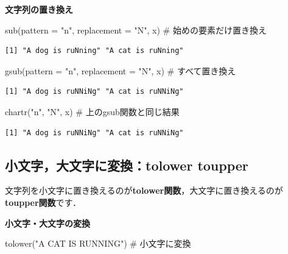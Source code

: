 \documentclass[
  letterpaper,
  DIV=11,
  numbers=noendperiod]{scrreprt}
\newenvironment{Shaded}{\begin{snugshade}}{\end{snugshade}}
\newcommand{\AttributeTok}[1]{\textcolor[rgb]{0.40,0.45,0.13}{#1}}
\newcommand{\CommentTok}[1]{\textcolor[rgb]{0.37,0.37,0.37}{#1}}
\newcommand{\FunctionTok}[1]{\textcolor[rgb]{0.28,0.35,0.67}{#1}}
\newcommand{\NormalTok}[1]{\textcolor[rgb]{0.00,0.23,0.31}{#1}}
\newcommand{\StringTok}[1]{\textcolor[rgb]{0.13,0.47,0.30}{#1}}
\begin{document}
\textbf{文字列の置き換え}

\begin{Shaded}
\begin{Highlighting}[]
\FunctionTok{sub}\NormalTok{(}\AttributeTok{pattern =} \StringTok{"n"}\NormalTok{, }\AttributeTok{replacement =} \StringTok{"N"}\NormalTok{, x) }\CommentTok{\# 始めの要素だけ置き換え}
\end{Highlighting}
\end{Shaded}

\begin{verbatim}
[1] "A dog is ruNning" "A cat is ruNning"
\end{verbatim}

\begin{Shaded}
\begin{Highlighting}[]
\FunctionTok{gsub}\NormalTok{(}\AttributeTok{pattern =} \StringTok{"n"}\NormalTok{, }\AttributeTok{replacement =} \StringTok{"N"}\NormalTok{, x) }\CommentTok{\# すべて置き換え}
\end{Highlighting}
\end{Shaded}

\begin{verbatim}
[1] "A dog is ruNNiNg" "A cat is ruNNiNg"
\end{verbatim}

\begin{Shaded}
\begin{Highlighting}[]
\FunctionTok{chartr}\NormalTok{(}\StringTok{"n"}\NormalTok{, }\StringTok{"N"}\NormalTok{, x) }\CommentTok{\# 上のgsub関数と同じ結果}
\end{Highlighting}
\end{Shaded}

\begin{verbatim}
[1] "A dog is ruNNiNg" "A cat is ruNNiNg"
\end{verbatim}

\hypertarget{ux5c0fux6587ux5b57ux5927ux6587ux5b57ux306bux5909ux63dbtolower-toupper}{%
\subsection{小文字，大文字に変換：tolower
toupper}\label{ux5c0fux6587ux5b57ux5927ux6587ux5b57ux306bux5909ux63dbtolower-toupper}}

文字列を小文字に置き換えるのが\textbf{tolower関数}，大文字に置き換えるのが\textbf{toupper関数}です．

\textbf{小文字・大文字の変換}

\begin{Shaded}
\begin{Highlighting}[]
\FunctionTok{tolower}\NormalTok{(}\StringTok{"A CAT IS RUNNING"}\NormalTok{) }\CommentTok{\# 小文字に変換}
\end{Highlighting}
\end{Shaded}
\end{document}
